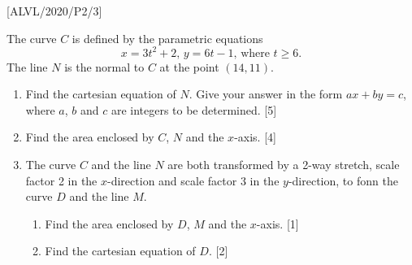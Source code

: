 \item {[}ALVL/2020/P2/3{]}

The curve $C$ is defined by the parametric equations
\[
x=3t^{2}+2,\,y=6t-1,\,\text{where }t\geq6.
\]
 The line $N$ is the normal to $C$ at the point $\left(14,11\right)$. 
\begin{enumerate}
\item Find the cartesian equation of $N$. Give your answer in the form
$ax+by=c$, where $a$, $b$ and $c$ are integers to be determined.\hfill{}
{[}5{]}
\item Find the area enclosed by $C$, $N$ and the $x$-axis. \hfill{}{[}4{]}
\item The curve $C$ and the line $N$ are both transformed by a 2-way stretch,
scale factor 2 in the $x$-direction and scale factor 3 in the $y$-direction,
to fonn the curve $D$ and the line $M$. 
\begin{enumerate}
\item Find the area enclosed by $D$, $M$ and the $x$-axis. \hfill{}{[}1{]}
\item Find the cartesian equation of $D$. \hfill{}{[}2{]}
\end{enumerate}
\end{enumerate}
